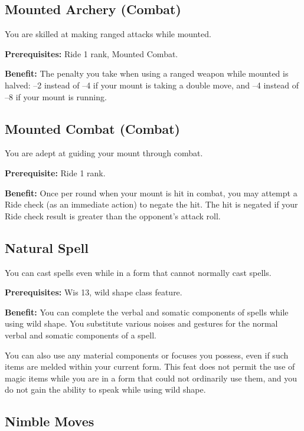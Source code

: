 \subsection{Mounted Archery (Combat)}

				
You are skilled at making ranged attacks while mounted.
				
\textbf{Prerequisites:} Ride 1 rank, Mounted Combat.
				
\textbf{Benefit:} The penalty you take when using a ranged weapon while mounted is halved: --2 instead of --4 if your mount is taking a double move, and --4 instead of --8 if your mount is running.
				
\subsection{Mounted Combat (Combat)}

				
You are adept at guiding your mount through combat.
				
\textbf{Prerequisite:} Ride 1 rank.
				
\textbf{Benefit:} Once per round when your mount is hit in combat, you may attempt a Ride check (as an immediate action) to negate the hit. The hit is negated if your Ride check result is greater than the opponent's attack roll.
				
\subsection{Natural Spell}

				
You can cast spells even while in a form that cannot normally cast spells.
				
\textbf{Prerequisites:} Wis 13, wild shape class feature.
				
\textbf{Benefit:} You can complete the verbal and somatic components of spells while using wild shape. You substitute various noises and gestures for the normal verbal and somatic components of a spell.

You can also use any material components or focuses you possess, even if such items are melded within your current form. This feat does not permit the use of magic items while you are in a form that could not ordinarily use them, and you do not gain the ability to speak while using wild shape.
				
\subsection{Nimble Moves}

